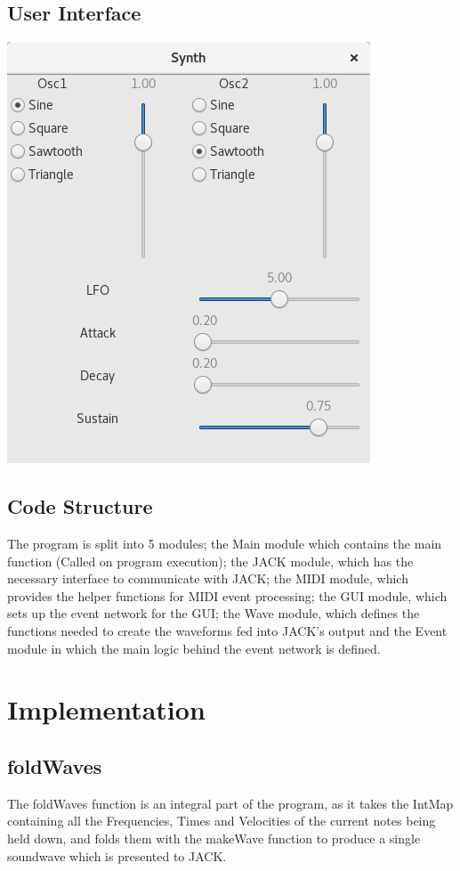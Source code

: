 \documentclass[11pt,a4paper]{article}
\begin{document}
\subsection{User Interface}
\includegraphics{GUI.png}

\subsection{Code Structure}
The program is split into 5 modules; the Main module which contains the main function (Called on program execution); the JACK module, which has the necessary interface to communicate with JACK; the MIDI module, which provides the helper functions for MIDI event processing; the GUI module, which sets up the event network for the GUI; the Wave module, which defines the functions needed to create the waveforms fed into JACK's output and the Event module in which the main logic behind the event network is defined.

\section{Implementation}
\subsection{foldWaves}
The foldWaves function is an integral part of the program, as it takes the IntMap containing all the Frequencies, Times and Velocities of the current notes being held down, and folds them with the makeWave function to produce a single soundwave which is presented to JACK.
\end{document}
